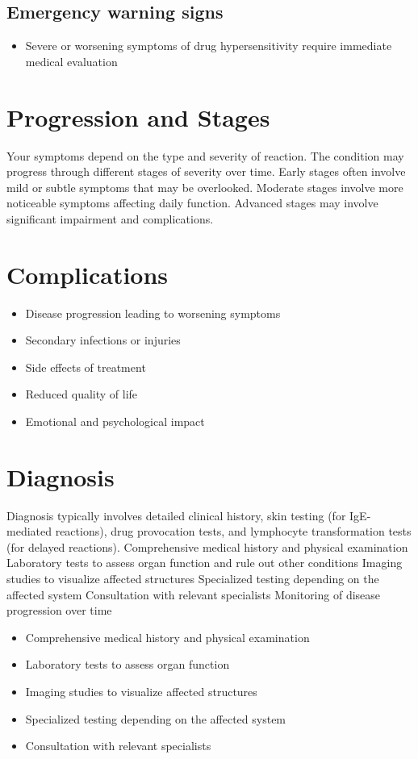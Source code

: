 \subsection{Emergency warning signs}
\begin{itemize}[noitemsep]
  \item Severe or worsening symptoms of drug hypersensitivity require immediate medical evaluation
\end{itemize}
\section{Progression and Stages}
Your symptoms depend on the type and severity of reaction. The condition may progress through different stages of severity over time. Early stages often involve mild or subtle symptoms that may be overlooked. Moderate stages involve more noticeable symptoms affecting daily function. Advanced stages may involve significant impairment and complications.
\section{Complications}
\begin{itemize}[noitemsep]
  \item Disease progression leading to worsening symptoms
  \item Secondary infections or injuries
  \item Side effects of treatment
  \item Reduced quality of life
  \item Emotional and psychological impact
\end{itemize}
\section{Diagnosis}
Diagnosis typically involves detailed clinical history, skin testing (for IgE-mediated reactions), drug provocation tests, and lymphocyte transformation tests (for delayed reactions). Comprehensive medical history and physical examination Laboratory tests to assess organ function and rule out other conditions Imaging studies to visualize affected structures Specialized testing depending on the affected system Consultation with relevant specialists Monitoring of disease progression over time

\begin{itemize}[noitemsep]
  \item Comprehensive medical history and physical examination
  \item Laboratory tests to assess organ function
  \item Imaging studies to visualize affected structures
  \item Specialized testing depending on the affected system
  \item Consultation with relevant specialists
\end{itemize}
